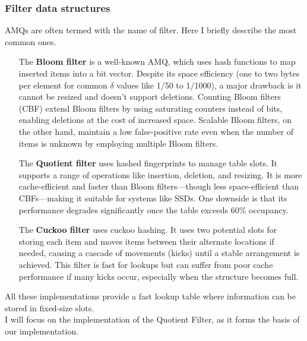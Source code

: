 \subsubsection{Filter data structures}
AMQs are often termed with the name of filter. Here I briefly describe the most common ones.
\begin{itemize}[leftmargin=1.8cm]
	\item[The \textbf{Bloom filter}] is a well-known \gls{AMQ}, which uses hash functions to map inserted items into a bit vector. Despite its space efficiency (one to two bytes per element for common $\delta$ values like 1/50 to 1/1000), a major drawback is it cannot be resized and doesn't support deletions. Counting Bloom filters (\gls{CBF}) extend Bloom filters by using saturating counters instead of bits, enabling deletions at the cost of increased space. Scalable Bloom filters, on the other hand, maintain a low false-positive rate even when the number of items is unknown by employing multiple Bloom filters.
	\item[The \textbf{Quotient filter}] uses hashed fingerprints to manage table slots. It supports a range of operations like insertion, deletion, and resizing. It is more cache-efficient and faster than Bloom filters—though less space-efficient than CBFs—making it suitable for systems like \gls{SSD}s. One downside is that its performance degrades significantly once the table exceeds 60\% occupancy.
	\item[The \textbf{Cuckoo filter}] uses cuckoo hashing. It uses two potential slots for storing each item and moves items between their alternate locations if needed, causing a cascade of movements (kicks) until a stable arrangement is achieved. This filter is fast for lookups but can suffer from poor cache performance if many kicks occur, especially when the structure becomes full.
\end{itemize}
All these implementations provide a fast lookup table where information can be stored in fixed-size slots.\\
I will focus on the implementation of the Quotient Filter, as it forms the basis of our implementation.

